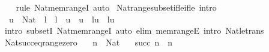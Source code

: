 \begin{isabellebody}
%
\isadelimproof
\ \ %
\endisadelimproof
%
\isatagproof
{}\isamarkupfalse%
\ {\isacharparenleft}{\kern0pt}rule\ Nat{\isacharunderscore}{\kern0pt}mem{\isacharunderscore}{\kern0pt}rangeI{\isacharparenright}{\kern0pt}\ auto%
\endisatagproof
{\isafoldproof}%
%
\isadelimproof
\isanewline
%
\endisadelimproof
\isanewline
{}\isamarkupfalse%
\ Nat{\isacharunderscore}{\kern0pt}range{\isacharunderscore}{\kern0pt}subset{\isacharunderscore}{\kern0pt}if{\isacharunderscore}{\kern0pt}le{\isacharunderscore}{\kern0pt}if{\isacharunderscore}{\kern0pt}le\ {\isacharbrackleft}{\kern0pt}intro{\isacharbrackright}{\kern0pt}{\isacharcolon}{\kern0pt}\isanewline
\ \ {\isachardoublequoteopen}u{\isacharprime}{\kern0pt}\ {\isacharcolon}{\kern0pt}\ Nat\ {\isasymLongrightarrow}\ l{\isacharprime}{\kern0pt}\ {\isasymle}\ l\ {\isasymLongrightarrow}\ u\ {\isasymle}\ u{\isacharprime}{\kern0pt}\ {\isasymLongrightarrow}\ {\isacharbrackleft}{\kern0pt}l{\isacharcomma}{\kern0pt}{\isasymdots}{\isacharcomma}{\kern0pt}u{\isacharbrackright}{\kern0pt}\ {\isasymsubseteq}\ {\isacharbrackleft}{\kern0pt}l{\isacharprime}{\kern0pt}{\isacharcomma}{\kern0pt}{\isasymdots}{\isacharcomma}{\kern0pt}u{\isacharprime}{\kern0pt}{\isacharbrackright}{\kern0pt}{\isachardoublequoteclose}\isanewline
%
\isadelimproof
\ \ %
\endisadelimproof
%
\isatagproof
{}\isamarkupfalse%
\ {\isacharparenleft}{\kern0pt}intro\ subsetI\ Nat{\isacharunderscore}{\kern0pt}mem{\isacharunderscore}{\kern0pt}rangeI{\isacharparenright}{\kern0pt}\ {\isacharparenleft}{\kern0pt}auto\ elim{\isacharbang}{\kern0pt}{\isacharcolon}{\kern0pt}\ mem{\isacharunderscore}{\kern0pt}rangeE\ intro{\isacharcolon}{\kern0pt}\ Nat{\isacharunderscore}{\kern0pt}le{\isacharunderscore}{\kern0pt}trans{\isacharparenright}{\kern0pt}%
\endisatagproof
{\isafoldproof}%
%
\isadelimproof
\isanewline
%
\endisadelimproof
\isanewline
{}\isamarkupfalse%
\ Nat{\isacharunderscore}{\kern0pt}succ{\isacharunderscore}{\kern0pt}eq{\isacharunderscore}{\kern0pt}range{\isacharunderscore}{\kern0pt}zero{\isacharcolon}{\kern0pt}\isanewline
\ \ \ {\isachardoublequoteopen}n\ {\isacharcolon}{\kern0pt}\ Nat{\isachardoublequoteclose}\isanewline
\ \ \ {\isachardoublequoteopen}succ\ n\ {\isacharequal}{\kern0pt}\ {\isacharbrackleft}{\kern0pt}{}{\isacharcomma}{\kern0pt}{\isasymdots}{\isacharcomma}{\kern0pt}n{\isacharbrackright}{\kern0pt}{\isachardoublequoteclose}\isanewline
%
\isadelimproof
%
\endisadelimproof
%
\isatagproof
{}\isamarkupfalse%
\ {\isacharminus}{\kern0pt}\isanewline
\ \ \isamarkupfalse%

\end{isabellebody}
